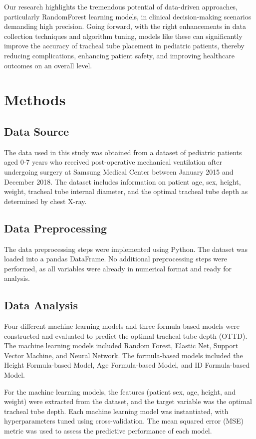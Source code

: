 \documentclass[11pt]{article}
\begin{document}
Our research highlights the tremendous potential of data-driven approaches, particularly RandomForest learning models, in clinical decision-making scenarios demanding high precision. Going forward, with the right enhancements in data collection techniques and algorithm tuning, models like these can significantly improve the accuracy of tracheal tube placement in pediatric patients, thereby reducing complications, enhancing patient safety, and improving healthcare outcomes on an overall level.

\section*{Methods}

\subsection*{Data Source}
The data used in this study was obtained from a dataset of pediatric patients aged 0-7 years who received post-operative mechanical ventilation after undergoing surgery at Samsung Medical Center between January 2015 and December 2018. The dataset includes information on patient age, sex, height, weight, tracheal tube internal diameter, and the optimal tracheal tube depth as determined by chest X-ray.

\subsection*{Data Preprocessing}
The data preprocessing steps were implemented using Python. The dataset was loaded into a pandas DataFrame. No additional preprocessing steps were performed, as all variables were already in numerical format and ready for analysis.

\subsection*{Data Analysis}
Four different machine learning models and three formula-based models were constructed and evaluated to predict the optimal tracheal tube depth (OTTD). The machine learning models included Random Forest, Elastic Net, Support Vector Machine, and Neural Network. The formula-based models included the Height Formula-based Model, Age Formula-based Model, and ID Formula-based Model.

For the machine learning models, the features (patient sex, age, height, and weight) were extracted from the dataset, and the target variable was the optimal tracheal tube depth. Each machine learning model was instantiated, with hyperparameters tuned using cross-validation. The mean squared error (MSE) metric was used to assess the predictive performance of each model.
\end{document}
